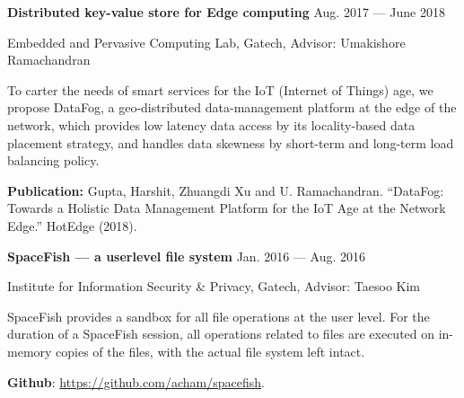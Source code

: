 \parbox[t][][t]{\linewidth}{
	\parbox{\linewidth}{\textbf{Distributed key-value store for Edge computing}
		\hfill {{Aug. 2017 --- June 2018}}}
		\smallbreak
	\parbox{\linewidth}{Embedded and Pervasive Computing Lab, Gatech, Advisor: Umakishore Ramachandran}
  \smallbreak	
   To carter the needs of smart services for the IoT (Internet of Things) age, we propose DataFog, a geo-distributed data-management platform at the edge of the network, which provides low latency data access by its locality-based data placement strategy, and handles data skewness by short-term and long-term load balancing policy.

  \textbf{Publication:} Gupta, Harshit, Zhuangdi Xu and U. Ramachandran. “DataFog: Towards a Holistic Data Management Platform for the IoT Age at the Network Edge.” HotEdge (2018).
	\bigskip
}

\parbox[t][][t]{\linewidth}{
	\parbox{\linewidth}{\textbf{SpaceFish --- a userlevel file system}
		\hfill {{Jan. 2016 --- Aug. 2016}}}
		\smallbreak
	\parbox{\linewidth}{Institute for Information Security \& Privacy, Gatech, Advisor: Taesoo Kim}

  \smallbreak
  SpaceFish provides a sandbox for all file operations at the user level. For the duration of a SpaceFish session, all operations related to files are executed on in-memory copies of the files, with the actual file system left intact.

  \textbf{Github}: \url{https://github.com/acham/spacefish}.
}






